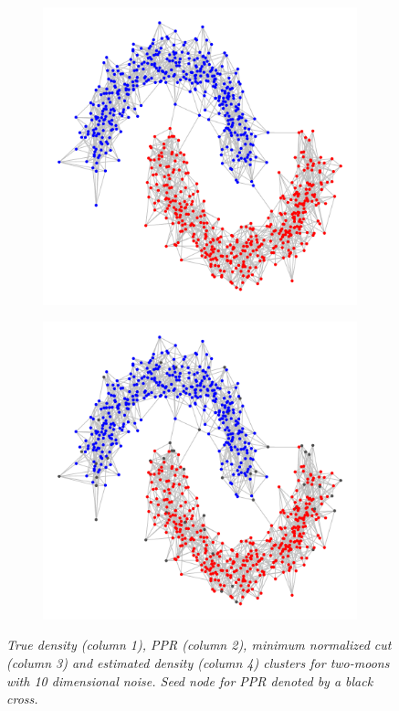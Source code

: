 \begin{figure}
\begin{adjustbox}{minipage=\linewidth,scale=0.8}
\begin{subfigure}{.24\linewidth}
			\caption{}
		\end{subfigure}
		\begin{subfigure}{.24\linewidth}
			\includegraphics[width=\linewidth]{plots/experiment_2/row4_conductance_cluster}
			\caption{}
		\end{subfigure}
		\begin{subfigure}{.24\linewidth}
			\includegraphics[width=\linewidth]{plots/experiment_2/row4_density_cluster}
			\caption{}
		\end{subfigure}
		\caption{\it\small True density (column 1), PPR (column 2), minimum normalized
			cut (column 3) and estimated density (column 4) clusters for two-moons with 10 dimensional noise. Seed node for PPR denoted by a black cross.} 
		\label{fig:moons_hd}
	\end{adjustbox}
\end{figure}